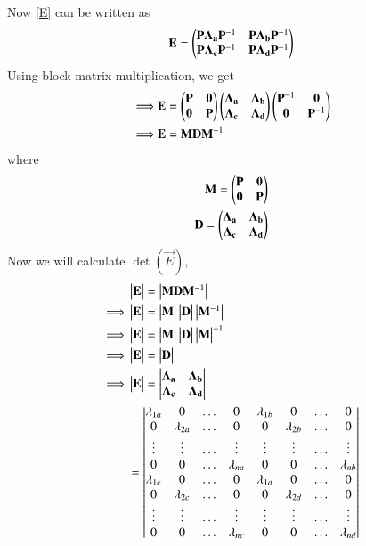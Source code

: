 \documentclass[journal,12pt,twocolumn]{IEEEtran}
\begin{document}
Now \eqref{E} can be written as
\begin{align}
    \mathbf{E}=\begin{pmatrix}\mathbf{P}\mathbf{\Lambda_a}\mathbf{P}^{-1} & \mathbf{P}\mathbf{\Lambda_b}\mathbf{P}^{-1}\\\mathbf{P}\mathbf{\Lambda_c}\mathbf{P}^{-1} & \mathbf{P}\mathbf{\Lambda_d}\mathbf{P}^{-1}\end{pmatrix}
\end{align}
Using block matrix multiplication, we get
\begin{align}
    \implies&\mathbf{E}=\begin{pmatrix}\mathbf{P} & \mathbf{0}\\\mathbf{0} & \mathbf{P}\end{pmatrix}\begin{pmatrix}\mathbf{\Lambda_a} & \mathbf{\Lambda_b}\\\mathbf{\Lambda_c} & \mathbf{\Lambda_d}\end{pmatrix}\begin{pmatrix}\mathbf{P}^{-1} & \mathbf{0}\\\mathbf{0} & \mathbf{P}^{-1}\end{pmatrix}\\
    \implies&\mathbf{E}=\mathbf{M}\mathbf{D}\mathbf{M}^{-1}\label{Edec}
\end{align}
where
\begin{align}
    \mathbf{M}=\begin{pmatrix}\mathbf{P} & \mathbf{0}\\\mathbf{0} & \mathbf{P}\end{pmatrix}\\
    \mathbf{D}=\begin{pmatrix}\mathbf{\Lambda_a} & \mathbf{\Lambda_b}\\\mathbf{\Lambda_c} & \mathbf{\Lambda_d}\end{pmatrix}
\end{align}
Now we will calculate $\det(\vec{E})$,
\begin{align}
    &\begin{vmatrix}\mathbf{E}\end{vmatrix}=\begin{vmatrix}\mathbf{M}\mathbf{D}\mathbf{M}^{-1}\end{vmatrix}\\
    \implies&\begin{vmatrix}\mathbf{E}\end{vmatrix}=\begin{vmatrix}\mathbf{M}\end{vmatrix}\begin{vmatrix}\mathbf{D}\end{vmatrix}\begin{vmatrix}\mathbf{M}^{-1}\end{vmatrix}\\
    \implies&\begin{vmatrix}\mathbf{E}\end{vmatrix}=\begin{vmatrix}\mathbf{M}\end{vmatrix}\begin{vmatrix}\mathbf{D}\end{vmatrix}\begin{vmatrix}\mathbf{M}\end{vmatrix}^{-1}\\
    \implies&\begin{vmatrix}\mathbf{E}\end{vmatrix}=\begin{vmatrix}\mathbf{D}\end{vmatrix}\label{EeqD}\\
    \implies&\begin{vmatrix}\mathbf{E}\end{vmatrix}=\begin{vmatrix}\mathbf{\Lambda_a} & \mathbf{\Lambda_b}\\\mathbf{\Lambda_c} & \mathbf{\Lambda_d}\end{vmatrix}\\
    &=\begin{vmatrix}\lambda_{1a}&0&\dots&0&\lambda_{1b}&0&\dots&0\\0&\lambda_{2a}&\dots&0&0&\lambda_{2b}&\dots&0\\\vdots&\vdots&\dots&\vdots&\vdots&\vdots&\dots&\vdots\\0&0&\dots&\lambda_{na}&0&0&\dots&\lambda_{nb}\\\lambda_{1c}&0&\dots&0&\lambda_{1d}&0&\dots&0\\0&\lambda_{2c}&\dots&0&0&\lambda_{2d}&\dots&0\\\vdots&\vdots&\dots&\vdots&\vdots&\vdots&\dots&\vdots\\0&0&\dots&\lambda_{nc}&0&0&\dots&\lambda_{nd}\end{vmatrix}
\end{align}
\end{document}

